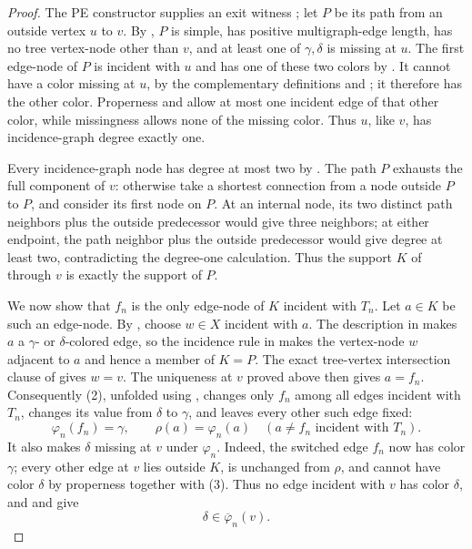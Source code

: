 \begin{proof}
The PE constructor supplies an exit witness ; let \(P\)
be its path from an outside vertex \(u\) to \(v\).  By
, \(P\) is simple, has positive multigraph-edge
length, has no tree vertex-node other than \(v\), and at least one of
\(\gamma,\delta\) is missing at \(u\).  The first edge-node of \(P\) is
incident with \(u\) and has one of these two colors by
.  It cannot have a color missing at
\(u\), by the complementary definitions  and
; it therefore has the other color.  Properness
and  allow at most one incident edge of that other
color, while missingness allows none of the missing color.  Thus \(u\),
like \(v\), has incidence-graph degree exactly one.

Every incidence-graph node has degree at most two by
.  The path \(P\) exhausts the
full component of \(v\): otherwise take a shortest connection from a node
outside \(P\) to \(P\), and consider its first node on \(P\).  At an
internal node, its two distinct path neighbors plus the outside predecessor
would give three neighbors; at either endpoint, the path neighbor plus the
outside predecessor would give degree at least two, contradicting the
degree-one calculation.  Thus the support \(K\) of
 through \(v\) is exactly the support of \(P\).

We now show that \(f_n\) is the only edge-node of \(K\) incident with
\(T_n\).  Let \(a\in K\) be such an edge-node.  By
, choose \(w\in X\) incident with \(a\).  The
description in  makes \(a\) a
\(\gamma\)- or \(\delta\)-colored edge, so the incidence rule in
 makes the vertex-node \(w\) adjacent to
\(a\) and hence a member of \(K=P\).  The exact tree-vertex intersection
clause of  gives \(w=v\).  The uniqueness at \(v\)
proved above then gives \(a=f_n\).  Consequently (2), unfolded using
, changes only \(f_n\) among all edges
incident with \(T_n\), changes its value from \(\delta\) to \(\gamma\),
and leaves every other such edge fixed:
\[
 \varphi_n(f_n)=\gamma,\qquad
 \rho(a)=\varphi_n(a)\quad(a\ne f_n\text{ incident with }T_n).  \tag{4}
\]
It also makes \(\delta\) missing at \(v\) under \(\varphi_n\).  Indeed,
the switched edge \(f_n\) now has color \(\gamma\); every other edge at
\(v\) lies outside \(K\), is unchanged from \(\rho\), and cannot have
color \(\delta\) by properness together with (3).  Thus no edge incident
with \(v\) has color \(\delta\), and
 and  give
\[
 \delta\in\overline\varphi_n(v).                                \tag{5}
\]


\end{proof}

